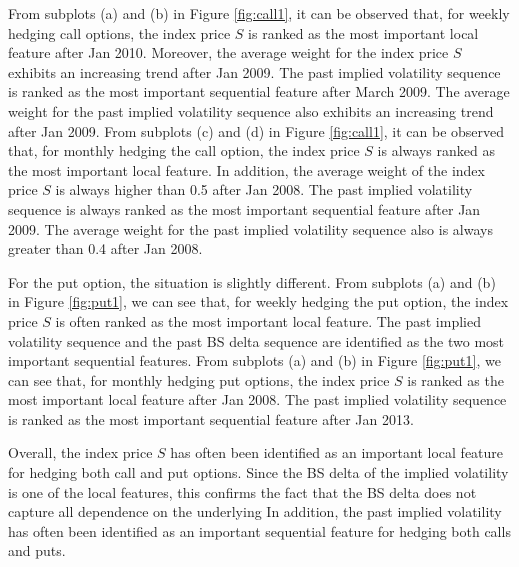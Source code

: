 \documentclass[letterpaper,12pt,titlepage,oneside,final]{book}
\numberwithin{equation}{section}
\theoremstyle{definition}
\begin{document}
From subplots (a) and (b) in Figure \ref{fig:call1}, it can be observed that, for weekly hedging  call options, the index price $S$ is ranked as the most important local feature after Jan 2010.
Moreover, the average weight for the index price  $S$ exhibits an increasing trend after Jan 2009.
The past implied volatility sequence is ranked as the most important sequential feature after March 2009. The average weight for the past implied volatility sequence also exhibits an increasing trend after Jan 2009. From subplots (c) and (d) in Figure \ref{fig:call1}, it can be observed that, for monthly hedging  the call option, the index price $S$ is always ranked as the most important local feature. In addition, the average weight of the index price  $S$ is always higher than 0.5 after Jan 2008.
The past implied volatility sequence is always ranked as the most important sequential feature after Jan 2009. The average weight for the past implied volatility sequence also is always greater than 0.4 after Jan 2008.

For the put option, the situation is slightly different. From subplots (a) and (b) in Figure \ref{fig:put1}, we can see that, for weekly hedging the put option, the index price $S$ is often ranked as the most important local feature. The past implied volatility sequence and the past BS delta sequence are identified as the two most important sequential features. From subplots (a) and (b) in Figure \ref{fig:put1}, we can see that, for monthly hedging put options, the index price $S$ is ranked as the most important local feature after Jan 2008. The past implied volatility sequence is ranked as the most important sequential feature after Jan 2013.

Overall, the index price $S$ has often been identified as an important local feature for hedging  both call and put options. Since the BS delta of the implied volatility is one of the local features, this confirms the fact that the BS delta does not capture all dependence on the underlying
In addition, the past implied volatility has often been identified as an important sequential feature for hedging both calls and puts.
\end{document}
